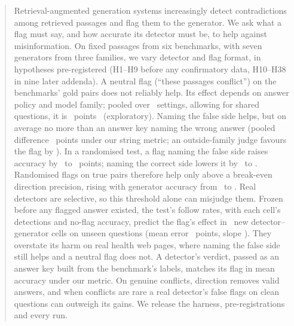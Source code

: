 \begin{abstract}
Retrieval-augmented generation systems increasingly detect contradictions among retrieved passages and flag them to
the generator. We ask what a flag must say, and how accurate its detector must be, to help against
misinformation. On fixed passages from six benchmarks, with seven generators from three families, we vary
detector and flag format, in hypotheses pre-registered (H1--H9 before any confirmatory data,
H10--H38 in nine later addenda). A neutral flag (``these passages conflict'') on the benchmarks' gold pairs does not reliably
help. Its effect depends on answer policy and model family; pooled over \neuMlK\ settings, allowing
for shared questions, it is \neuMlMu\ points \neuMlCI\ (exploratory). Naming the false side helps, but on average no more than
an answer key naming the wrong answer (pooled difference \PoolTwentyThree\ points under our string metric; an outside-family judge favours the flag by \jdTwentyThreeJ). In a
randomised test, a flag naming the false side raises accuracy by \hThirtyOneAMin\ to \hThirtyOneAMax\ points; naming the correct side lowers it by
\ahThirtyOneBMax\ to \ahThirtyOneBMin. Randomised flags on true pairs therefore help only above a break-even direction
precision, rising with generator accuracy from \beMin\ to \beMax. Real detectors are selective, so this
threshold alone can misjudge them. Frozen before any flagged answer existed, the test's follow rates, with each cell's detections and no-flag accuracy,
predict the flag's effect in \frN\ new detector--generator cells on unseen questions (mean error \frMae\ points, slope \frSlope).
They overstate its harm on real health web pages, where
naming the false side still helps and a neutral flag does not. A detector's verdict, passed as an answer key built from the benchmark's labels, matches its flag in mean
accuracy under our metric. On genuine
conflicts, direction removes valid answers, and when conflicts are rare a real detector's false flags on clean
questions can outweigh its gains. We release the harness, pre-registrations and every run.
\end{abstract}
